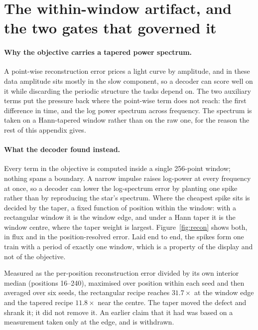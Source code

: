 \documentclass{article}
\begin{document}
\section{The within-window artifact, and the two gates that governed it}
\label{app:artifact}

\paragraph{Why the objective carries a tapered power spectrum.} A point-wise reconstruction error
prices a light curve by amplitude, and in these data amplitude sits mostly in the slow component, so
a decoder can score well on it while discarding the periodic structure the tasks depend on. The two
auxiliary terms put the pressure back where the point-wise term does not reach: the first difference
in time, and the log power spectrum across frequency. The spectrum is taken on a Hann-tapered window
rather than on the raw one, for the reason the rest of this appendix gives.

\paragraph{What the decoder found instead.} Every term in the objective is computed inside a single
256-point window; nothing spans a boundary. A narrow impulse raises log-power at every frequency at
once, so a decoder can lower the log-spectrum error by planting one spike rather than by reproducing
the star's spectrum. Where the cheapest spike sits is decided by the taper, a fixed function of
position within the window: with a rectangular window it is the window edge, and under a Hann taper
it is the window centre, where the taper weight is largest. Figure~\ref{fig:recon} shows both, in
flux and in the position-resolved error. Laid end to end, the spikes form one train with a period of
exactly one window, which is a property of the display and not of the objective.

Measured as the per-position reconstruction error divided by its own interior median (positions
16--240), maximised over position within each seed and then averaged over six seeds, the rectangular
recipe reaches $31.7\times$ at the window edge and the tapered recipe $11.8\times$ near the centre.
The taper moved the defect and shrank it; it did not remove it. An earlier claim that it had was
based on a measurement taken only at the edge, and is withdrawn.
\end{document}
